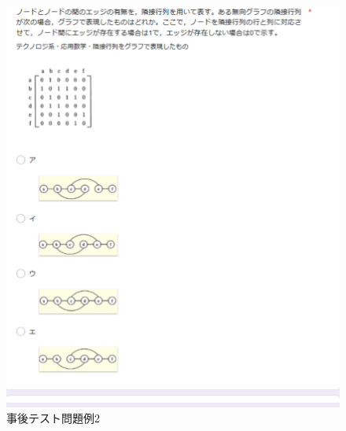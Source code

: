 \begin{figure}[htbp]
\begin{center}
\includegraphics[width=16cm]{img/jigo3.eps}
\end{center}
\caption{事後テスト問題例2}
\label{fig:jigo3}
\end{figure}

